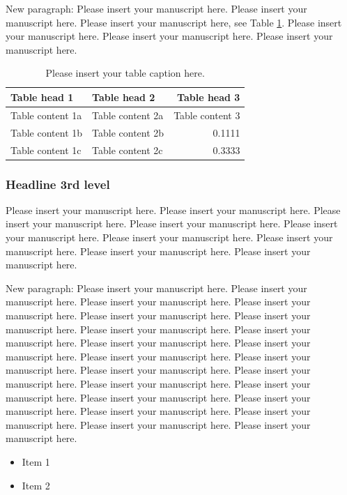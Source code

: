 \documentclass[USenglish,twocolumn]{article}
\begin{document}
New paragraph: Please insert your manuscript here. Please insert your manuscript here. Please insert your manuscript here, see Table \ref{tab:Table1}. Please insert your manuscript here. Please insert your manuscript here. Please insert your manuscript here.

\begin{table}
\caption{Please insert your table caption here.}
\begin{tabular}{llr}
Table head 1 			& Table head 2 			& Table head 3 		\\ \midrule
Table content 1a 	& Table content 2a 	& Table content 3 \\
Table content 1b	& Table content 2b	& 0.1111 					\\
Table content 1c	& Table content 2c 	& 0.3333 					\\
\end{tabular}
\label{tab:Table1}
\end{table}

\subsubsection{Headline 3rd level}
Please insert your manuscript here. Please insert your manuscript here. Please insert your manuscript here. Please insert your manuscript here. Please insert your manuscript here. Please insert your manuscript here. Please insert your manuscript here. Please insert your manuscript here. Please insert your manuscript here.

New paragraph: Please insert your manuscript here. Please insert your manuscript here. Please insert your manuscript here. Please insert your manuscript here. Please insert your manuscript here. Please insert your manuscript here.
Please insert your manuscript here. Please insert your manuscript here. Please insert your manuscript here. Please insert your manuscript here. Please insert your manuscript here. Please insert your manuscript here. Please insert your manuscript here. Please insert your manuscript here. Please insert your manuscript here. Please insert your manuscript here. Please insert your manuscript here. Please insert your manuscript here. Please insert your manuscript here. Please insert your manuscript here. Please insert your manuscript here. Please insert your manuscript here.

\begin{itemize}
\item Item 1
\item Item 2
\end{itemize}
\end{document}
